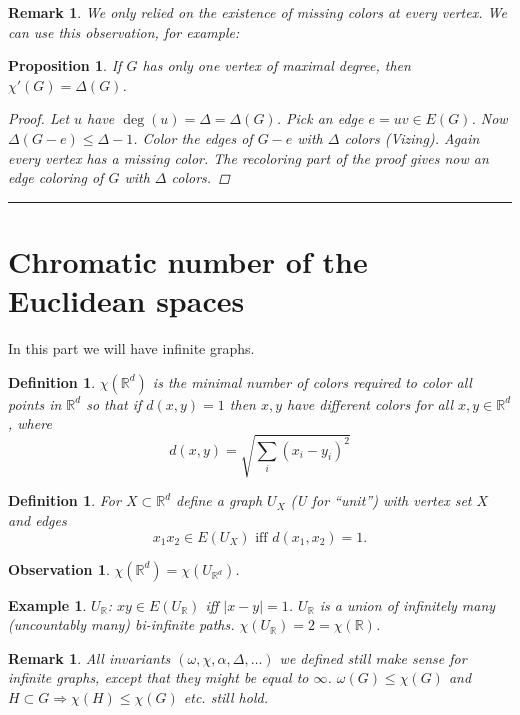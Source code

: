 \documentclass[a4paper]{article}
\theoremstyle{plain}
\newtheorem{definition}[lemma]{Definition}
\newtheorem{proposition}[lemma]{Proposition}
\newtheorem{observation}[lemma]{Observation}
\theoremstyle{myremark}
\newtheorem{remark}[lemma]{Remark}
\newtheorem{example}[lemma]{Example}
\begin{document}
\begin{remark}
We only relied on the existence of missing colors at every vertex. We
can use this observation, for example:
\end{remark}
\begin{proposition}
If $G$ has only one vertex of maximal degree, then $\chi'(G) =
\Delta(G)$.
\begin{proof}
Let $u$ have $\deg(u) = \Delta = \Delta(G)$. Pick an edge $e = uv \in E(G)$. Now
$\Delta(G - e) \le \Delta - 1$. Color the edges of $G - e$ with $\Delta$
colors (Vizing). Again every vertex has a missing color. The recoloring
part of the proof gives now an edge coloring of $G$ with $\Delta$
colors.
\end{proof}
\end{proposition}

\hrule
\section*{Chromatic number of the Euclidean spaces}
In this part we will have infinite graphs.
\begin{definition}
$\chi(\mathbb{R}^d)$ is the minimal number of colors required to color
all points in $\mathbb{R}^d$ so that if $d(x,y) = 1$ then $x,y$ have
different colors for all $x,y \in \mathbb{R}^d$, where 
\[
d(x,y) = \sqrt{\sum_i (x_i - y_i)^2}
\]
\end{definition}
\begin{definition}
For $X \subset \mathbb{R}^d$ define a graph $U_X$ (U for ``unit'') with
vertex set $X$ and edges
\[
x_1x_2 \in E(U_X) \text{ iff } d(x_1,x_2) = 1.
\]
\end{definition}
\begin{observation}
$\chi(\mathbb{R}^d) = \chi(U_{\mathbb{R}^d})$.
\end{observation}
\begin{example}
$U_{\mathbb{R}}$: $xy \in E(U_{\mathbb{R}})$ iff $|x - y| = 1$.
$U_{\mathbb{R}}$ is a union of infinitely many (uncountably many)
bi-infinite paths. $\chi(U_{\mathbb{R}}) = 2 = \chi(\mathbb{R})$.
\end{example}
\begin{remark}
All invariants $(\omega, \chi, \alpha, \Delta, \ldots)$ we defined still
make sense for infinite graphs, except that they might be equal to
$\infty$. $\omega(G) \le \chi(G)$ and $H \subset G \Rightarrow \chi(H)
\le \chi(G)$ etc. still hold.
\end{remark}
\end{document}
